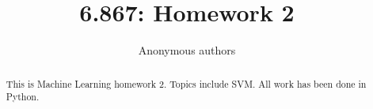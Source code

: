 \documentclass[letterpaper, 10 pt, conference]{ieeeconf}
\title{\LARGE \bf 6.867: Homework 2}
\author{Anonymous authors}
\begin{document}
\maketitle
\thispagestyle{empty} \pagestyle{empty}


\begin{abstract}
This is Machine Learning homework 2. Topics include SVM. All work has been done in Python.
\end{abstract}

% 

% 
%









\balance
%  
% 
\end{document}
